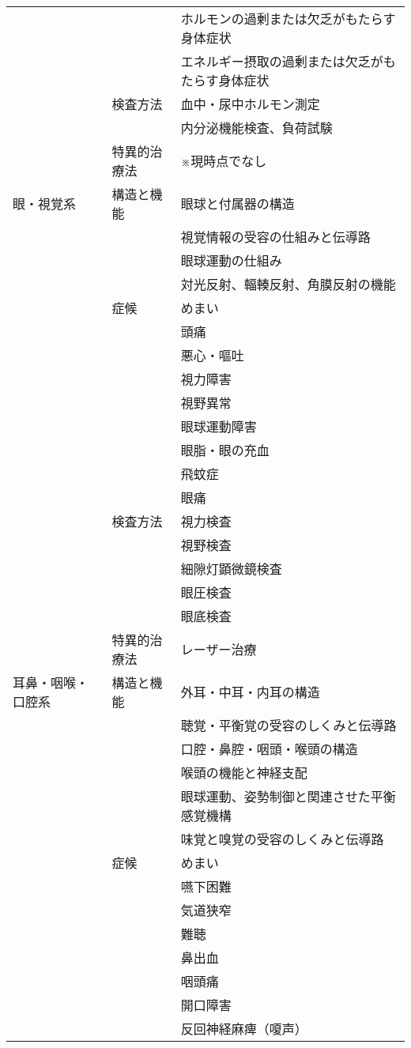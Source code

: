 \begin{xltabular}{\linewidth}{XXX}
 &  & ホルモンの過剰または欠乏がもたらす身体症状 \\
 &  & エネルギー摂取の過剰または欠乏がもたらす身体症状 \\
 & 検査方法 & 血中・尿中ホルモン測定 \\
 &  & 内分泌機能検査、負荷試験 \\
 & 特異的治療法 & ※現時点でなし \\
眼・視覚系 & 構造と機能 & 眼球と付属器の構造 \\
 &  & 視覚情報の受容の仕組みと伝導路 \\
 &  & 眼球運動の仕組み \\
 &  & 対光反射、輻輳反射、角膜反射の機能 \\
 & 症候 & めまい \\
 &  & 頭痛 \\
 &  & 悪心・嘔吐 \\
 &  & 視力障害 \\
 &  & 視野異常 \\
 &  & 眼球運動障害 \\
 &  & 眼脂・眼の充血 \\
 &  & 飛蚊症 \\
 &  & 眼痛 \\
 & 検査方法 & 視力検査 \\
 &  & 視野検査 \\
 &  & 細隙灯顕微鏡検査 \\
 &  & 眼圧検査 \\
 &  & 眼底検査 \\
 & 特異的治療法 & レーザー治療 \\
耳鼻・咽喉・口腔系 & 構造と機能 & 外耳・中耳・内耳の構造 \\
 &  & 聴覚・平衡覚の受容のしくみと伝導路 \\
 &  & 口腔・鼻腔・咽頭・喉頭の構造 \\
 &  & 喉頭の機能と神経支配 \\
 &  & 眼球運動、姿勢制御と関連させた平衡感覚機構 \\
 &  & 味覚と嗅覚の受容のしくみと伝導路 \\
 & 症候 & めまい \\
 &  & 嚥下困難 \\
 &  & 気道狭窄 \\
 &  & 難聴 \\
 &  & 鼻出血 \\
 &  & 咽頭痛 \\
 &  & 開口障害 \\
 &  & 反回神経麻痺（嗄声） \\

\end{xltabular}
